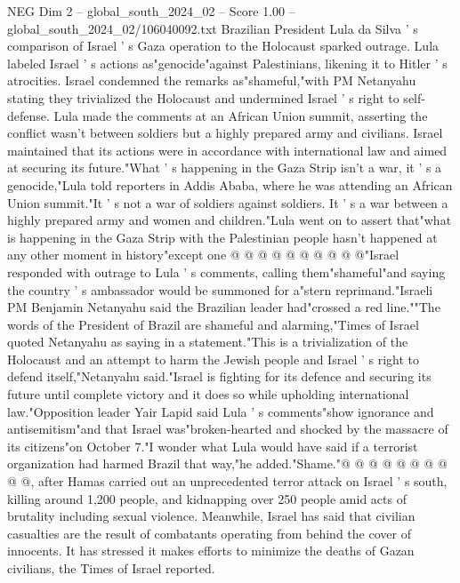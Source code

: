 \begin{textsample}{NEG Dim 2 – global\_south\_2024\_02 – Score 1.00 – global\_south\_2024\_02/106040092.txt}  \label{ex:f2_neg_251}
Brazilian President Lula da Silva ' s comparison of Israel ' s Gaza operation to the Holocaust sparked outrage.
Lula labeled Israel ' s actions as"genocide"against Palestinians, likening it to Hitler ' s atrocities.
Israel condemned the remarks as"shameful,"with PM Netanyahu stating they trivialized the Holocaust and undermined Israel ' s right to self-defense.
Lula made the comments at an African Union summit, asserting the conflict wasn't between soldiers but a highly prepared army and civilians.
Israel maintained that its actions were in accordance with international law and aimed at securing its future."What ' s happening in the Gaza Strip isn't a war, it ' s a genocide,"Lula told reporters in Addis Ababa, where he was attending an African Union summit."It ' s not a war of soldiers against soldiers.
It ' s a war between a highly prepared army and women and children."Lula went on to assert that"what is happening in the Gaza Strip with the Palestinian people hasn't happened at any other moment in history"except one @ @ @ @ @ @ @ @ @ @"Israel responded with outrage to Lula ' s comments, calling them"shameful"and saying the country ' s ambassador would be summoned for a"stern reprimand."Israeli PM Benjamin Netanyahu said the Brazilian leader had"crossed a red line.""The words of the President of Brazil are shameful and alarming,"Times of Israel quoted Netanyahu as saying in a statement."This is a trivialization of the Holocaust and an attempt to harm the Jewish people and Israel ' s right to defend itself,"Netanyahu said."Israel is fighting for its defence and securing its future until complete victory and it does so while upholding international law."Opposition leader Yair Lapid said Lula ' s comments"show ignorance and antisemitism"and that Israel was"broken-hearted and shocked by the massacre of its citizens"on October 7."I wonder what Lula would have said if a terrorist organization had harmed Brazil that way,"he added."Shame."@ @ @ @ @ @ @ @ @ @, after Hamas carried out an unprecedented terror attack on Israel ' s south, killing around 1,200 people, and kidnapping over 250 people amid acts of brutality including sexual violence.
Meanwhile, Israel has said that civilian casualties are the result of combatants operating from behind the cover of innocents.
It has stressed it makes efforts to minimize the deaths of Gazan civilians, the Times of Israel reported.

\end{textsample}
